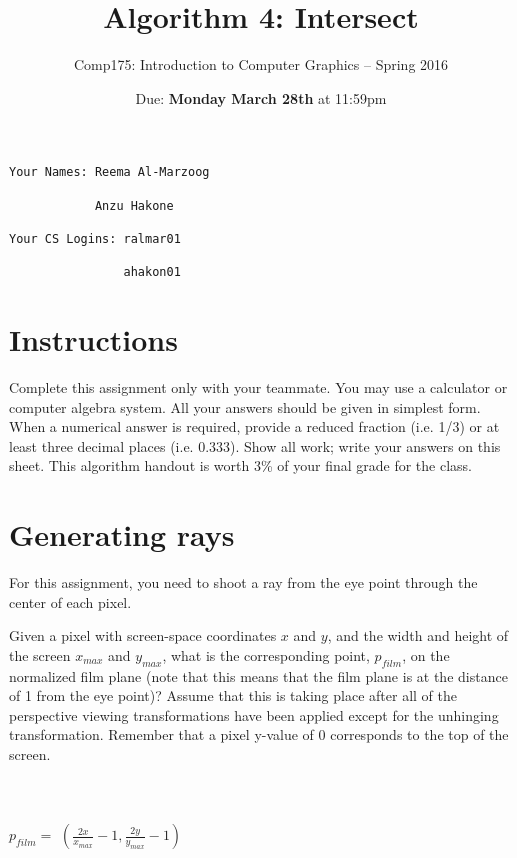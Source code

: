 \documentclass[10pt,twocolumn]{article}
\title{\Huge{\bf Algorithm 4: Intersect}}
\author{Comp175: Introduction to Computer Graphics -- Spring 2016}
\date{Due:  {\bf Monday March 28th} at 11:59pm}                                           %
\begin{document}
\maketitle

\begin{verbatim}
Your Names: Reema Al-Marzoog

            Anzu Hakone

Your CS Logins: ralmar01

                ahakon01
\end{verbatim}

\section{Instructions}
Complete this assignment only with your teammate. You may use a calculator or computer algebra system. All your answers should be given in simplest form. When a numerical answer is required, provide a reduced fraction (i.e. 1/3) or at least three decimal places (i.e. 0.333). Show all work; write your answers on this sheet. This algorithm handout is worth 3\% of your final grade for the class.

\section{Generating rays}
For this assignment, you need to shoot a ray from the eye point through the center of each pixel.

\begin{framed}
\noindent {\bf [1 point]} Given a pixel with screen-space coordinates $x$ and $y$, and the width and height of the screen $x_{max}$ and $y_{max}$, what is the corresponding point, $p_{film}$, on the normalized film plane (note that this means that the film plane is at the distance of 1 from the eye point)? Assume that this is taking place after all of the perspective viewing transformations have been applied except for the unhinging transformation. Remember that a pixel y-value of 0 corresponds to the top of the screen.\\\\\\\\
$p_{film} =$ $(\frac{2x}{x_{max}}-1, \frac{2y}{y_{max}}-1)$
\\\\\\
\end{framed}
\end{document}
